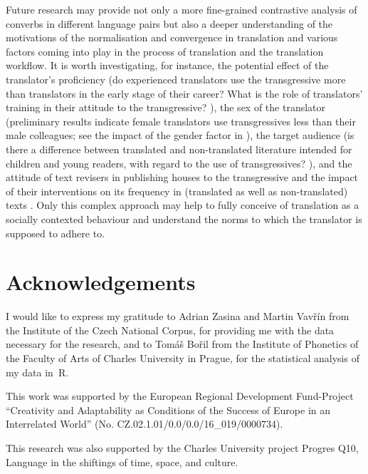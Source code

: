 \documentclass[output=paper,russian]{langsci/langscibook}
\begin{document}
Future research may provide not only a more fine-grained contrastive analysis of converbs in different language pairs but also a deeper understanding of the motivations of the normalisation and convergence in translation and various factors coming into play in the process of translation and the translation workflow. It is worth investigating, for instance, the potential effect of the translator’s proficiency (do experienced translators use the transgressive more than translators in the early stage of their career? What is the role of translators’ training in their attitude to the transgressive? \cite[cf.][]{lapshinova18}), the sex of the translator (preliminary results indicate female translators use transgressives less than their male colleagues; see the impact of the gender factor in \cite{magdef18}), the target audience (is there a difference between translated and non-translated literature intended for children and young readers, with regard to the use of transgressives? \cite[cf. e.g.][]{cermakova17}), and the attitude of text revisers in publishing houses to the transgressive and the impact of their interventions on its frequency in (translated as well as non-translated) texts \parencites[see also][]{bisiada17}{bisiada18}{bisiada19}{kruger18}. Only this complex approach may help to fully conceive of translation as a socially contexted behaviour and understand the norms to which the translator is supposed to adhere to.

\section*{Acknowledgements}

I would like to express my gratitude to Adrian Zasina and Martin Vavřín from the Institute of the Czech National Corpus, for providing me with the data necessary for the research, and to Tomáš Bořil from the Institute of Phonetics of the Faculty of Arts of Charles University in Prague, for the statistical analysis of my data in~R.

\hspace*{-1mm}This work was supported by the European Regional Development Fund-Project \enquote{Creativity and Adaptability as Conditions of the Success of Europe in an Interrelated World} (No. CZ.02.1.01/0.0/0.0/16\_019/0000734).

This research was also supported by the Charles University project Progres Q10, Language in the shiftings of time, space, and culture.

{\sloppy\printbibliography[heading=subbibliography,notkeyword=this]}
\end{document}
